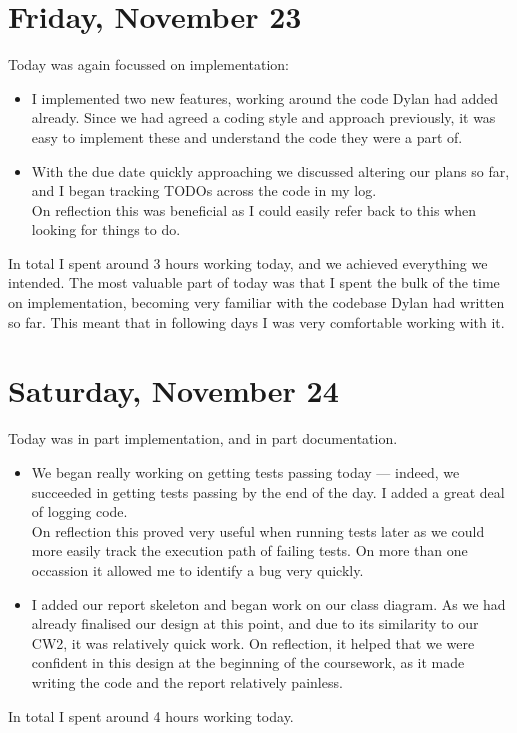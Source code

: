 \documentclass[titlepage, 12pt]{extarticle}
\begin{document}
\section{Friday, November 23}
Today was again focussed on implementation:
\begin{itemize}
\item I implemented two new features, working around the code Dylan had added already. Since we had agreed a coding style and approach previously, it was easy to implement these and understand the code they were a part of. 
\item With the due date quickly approaching we discussed altering our plans so far, and I began tracking TODOs across the code in my log. \\ On reflection this was beneficial as I could easily refer back to this when looking for things to do. 
\end{itemize}
In total I spent around 3 hours working today, and we achieved everything we intended. The most valuable part of today was that I spent the bulk of the time on implementation, becoming very familiar with the codebase Dylan had written so far. This meant that in following days I was very comfortable working with it.

\section{Saturday, November 24}
Today was in part implementation, and in part documentation.

\begin{itemize}
\item We began really working on getting tests passing today --- indeed, we succeeded in getting tests passing by the end of the day. I added a great deal of logging code. \\ On reflection this proved very useful when running tests later as we could more easily track the execution path of failing tests. On more than one occassion it allowed me to identify a bug very quickly. 
\item I added our report skeleton and began work on our class diagram. As we had already finalised our design at this point, and due to its similarity to our CW2, it was relatively quick work. On reflection, it helped that we were confident in this design at the beginning of the coursework, as it made writing the code and the report relatively painless.
\end{itemize}
In total I spent around 4 hours working today.
\end{document}
